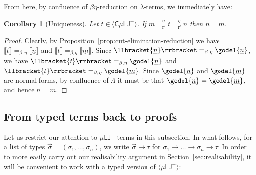 \documentclass[10pt,a4paper]{amsart}
\theoremstyle{plain}
\newtheorem{corollary}[corollary]{Corollary}
\theoremstyle{definition}
\theoremstyle{plain}
\theoremstyle{definition} %
\newcommand{\numeral}[1]{\underline{#1}}
\newcommand{\cod}[1]{\numeral{#1}} %
\newcommand{\sem}[1]{\llbracket {#1} \rrbracket}
\newcommand{\Terms}{\mathrm{Ter}}
\newcommand{\terms}{\Terms} %
\newcommand{\regular}{\mathbf R}
\newcommand{\regularterms}{\regular\Terms}
\newcommand{\closure}[1]{\langle #1 \rangle}
\newcommand{\clomuLJneg}{\closure{\muLJneg}}
\newcommand{\LJ}{\mathsf{LJ}}
\newcommand{\muLJ}{\mu\LJ}
\newcommand{\muLJneg}{\muLJ^-}
\newcommand{\circular}{\mathsf C}
\newcommand{\cmuLJ}{\circular\muLJ}
\newcommand{\cmuLJneg}{\cmuLJ^-}
\newcommand{\rewrite}{\rightsquigarrow}
\newcommand{\cutreduction}{\mathrm{cr}}
\newcommand{\cutred}{\rewrite_{\cutreduction}}
\newcommand{\cutelim}{\cutred} %
\newcommand{\reductionnorec}{\mathrm{r}'}
\newcommand{\convertsnorec}{=_{\reductionnorec}}
\newcommand{\convertsnoreceta}{=_{\reductionnorec}^\eta} %
\newcommand{\betaeta}{=_{\beta, \eta}}
\newcommand{\der}{P}
\begin{document}
From here, by confluence of $\beta\eta$-reduction on $\lambda$-terms, we immediately have:
\begin{corollary}[Uniqueness]\label{thm:uniqueness} Let $t \in \closure \cmuLJneg$. If $\cod m \convertsnoreceta t \convertsnoreceta \cod{n}$ then $n=m$.
\end{corollary}
\begin{proof}
    Clearly, by Proposition~\ref{prop:cut-elimination-reduction} we have $\sem{t} \betaeta \sem{\cod{n}}$ and $\sem{t} \betaeta \sem{\cod{m}}$. Since $\sem{\cod{n}}\betaeta \godel{\cod n}$, we have $\sem{t} \betaeta \godel{\cod n}$ and $\sem{t} \betaeta \godel{\cod m}$. Since $ \godel{\cod n}$ and $\godel{\cod m}$ are normal forms, by confluence of  $\Lambda$ it must be that  $ \godel{\cod n}=\godel{\cod m}$, and hence $n=m$.
\end{proof}









\subsection{From typed terms back to proofs}\label{subsec:from-typed-terms-back-to-proofs.}
Let us restrict our attention to $\muLJneg$-terms in this subsection. 
{In what follows, for a list of types $\vec \sigma=(\sigma_1, \ldots, \sigma_n)$,  we write  $\vec \sigma \to \tau$ for $\sigma_1 \to \ldots \to \sigma_n \to \tau$}.
In order to more easily carry out our realisability argument in Section~\ref{sec:realisability}, it will be convenient to work with a typed version of $\clomuLJneg$:
\end{document}
